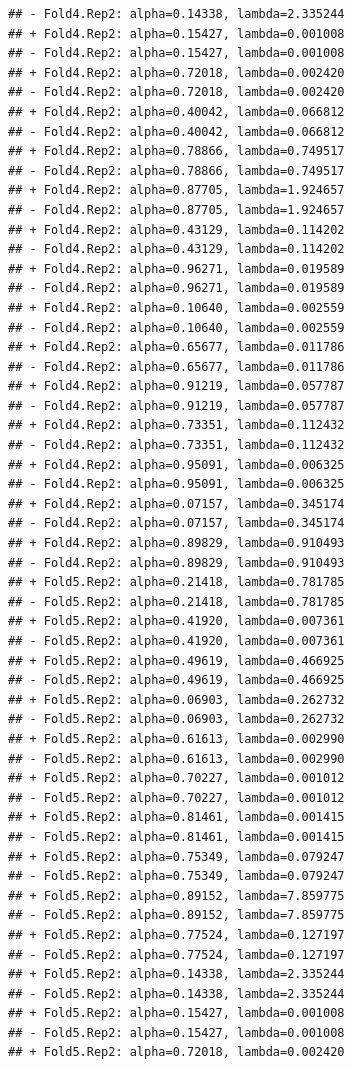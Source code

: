 \documentclass[
]{article}
\begin{document}
\begin{verbatim}
## - Fold4.Rep2: alpha=0.14338, lambda=2.335244 
## + Fold4.Rep2: alpha=0.15427, lambda=0.001008 
## - Fold4.Rep2: alpha=0.15427, lambda=0.001008 
## + Fold4.Rep2: alpha=0.72018, lambda=0.002420 
## - Fold4.Rep2: alpha=0.72018, lambda=0.002420 
## + Fold4.Rep2: alpha=0.40042, lambda=0.066812 
## - Fold4.Rep2: alpha=0.40042, lambda=0.066812 
## + Fold4.Rep2: alpha=0.78866, lambda=0.749517 
## - Fold4.Rep2: alpha=0.78866, lambda=0.749517 
## + Fold4.Rep2: alpha=0.87705, lambda=1.924657 
## - Fold4.Rep2: alpha=0.87705, lambda=1.924657 
## + Fold4.Rep2: alpha=0.43129, lambda=0.114202 
## - Fold4.Rep2: alpha=0.43129, lambda=0.114202 
## + Fold4.Rep2: alpha=0.96271, lambda=0.019589 
## - Fold4.Rep2: alpha=0.96271, lambda=0.019589 
## + Fold4.Rep2: alpha=0.10640, lambda=0.002559 
## - Fold4.Rep2: alpha=0.10640, lambda=0.002559 
## + Fold4.Rep2: alpha=0.65677, lambda=0.011786 
## - Fold4.Rep2: alpha=0.65677, lambda=0.011786 
## + Fold4.Rep2: alpha=0.91219, lambda=0.057787 
## - Fold4.Rep2: alpha=0.91219, lambda=0.057787 
## + Fold4.Rep2: alpha=0.73351, lambda=0.112432 
## - Fold4.Rep2: alpha=0.73351, lambda=0.112432 
## + Fold4.Rep2: alpha=0.95091, lambda=0.006325 
## - Fold4.Rep2: alpha=0.95091, lambda=0.006325 
## + Fold4.Rep2: alpha=0.07157, lambda=0.345174 
## - Fold4.Rep2: alpha=0.07157, lambda=0.345174 
## + Fold4.Rep2: alpha=0.89829, lambda=0.910493 
## - Fold4.Rep2: alpha=0.89829, lambda=0.910493 
## + Fold5.Rep2: alpha=0.21418, lambda=0.781785 
## - Fold5.Rep2: alpha=0.21418, lambda=0.781785 
## + Fold5.Rep2: alpha=0.41920, lambda=0.007361 
## - Fold5.Rep2: alpha=0.41920, lambda=0.007361 
## + Fold5.Rep2: alpha=0.49619, lambda=0.466925 
## - Fold5.Rep2: alpha=0.49619, lambda=0.466925 
## + Fold5.Rep2: alpha=0.06903, lambda=0.262732 
## - Fold5.Rep2: alpha=0.06903, lambda=0.262732 
## + Fold5.Rep2: alpha=0.61613, lambda=0.002990 
## - Fold5.Rep2: alpha=0.61613, lambda=0.002990 
## + Fold5.Rep2: alpha=0.70227, lambda=0.001012 
## - Fold5.Rep2: alpha=0.70227, lambda=0.001012 
## + Fold5.Rep2: alpha=0.81461, lambda=0.001415 
## - Fold5.Rep2: alpha=0.81461, lambda=0.001415 
## + Fold5.Rep2: alpha=0.75349, lambda=0.079247 
## - Fold5.Rep2: alpha=0.75349, lambda=0.079247 
## + Fold5.Rep2: alpha=0.89152, lambda=7.859775 
## - Fold5.Rep2: alpha=0.89152, lambda=7.859775 
## + Fold5.Rep2: alpha=0.77524, lambda=0.127197 
## - Fold5.Rep2: alpha=0.77524, lambda=0.127197 
## + Fold5.Rep2: alpha=0.14338, lambda=2.335244 
## - Fold5.Rep2: alpha=0.14338, lambda=2.335244 
## + Fold5.Rep2: alpha=0.15427, lambda=0.001008 
## - Fold5.Rep2: alpha=0.15427, lambda=0.001008 
## + Fold5.Rep2: alpha=0.72018, lambda=0.002420 

\end{verbatim}
\end{document}
